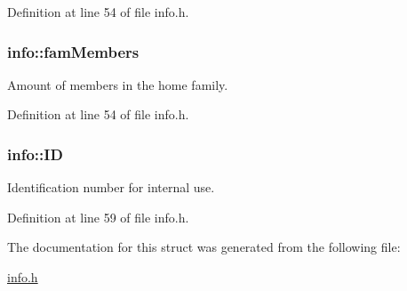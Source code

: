Definition at line 54 of file info.\+h.

\hypertarget{structinfo_a1b51e61437e4e0b422a49ad00b8a4e65}{
\subsubsection[{fam\+Members}]{\setlength{\rightskip}{0pt plus 5cm}info\+::fam\+Members}}\label{structinfo_a1b51e61437e4e0b422a49ad00b8a4e65}


Amount of members in the home family. 



Definition at line 54 of file info.\+h.

\hypertarget{structinfo_a3c042f827b9847005666b1ecc5221549}{
\subsubsection[{I\+D}]{\setlength{\rightskip}{0pt plus 5cm}info\+::\+I\+D}}\label{structinfo_a3c042f827b9847005666b1ecc5221549}


Identification number for internal use. 



Definition at line 59 of file info.\+h.



The documentation for this struct was generated from the following file\+:\begin{DoxyCompactItemize}
\item 
\hyperlink{info_8h}{info.\+h}\end{DoxyCompactItemize}
